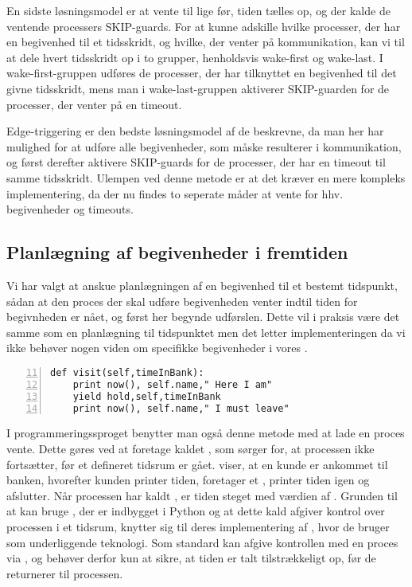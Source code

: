 En sidste løsningsmodel er at vente til lige før, tiden tælles op, og der kalde de ventende processers SKIP-guards. 
For at kunne adskille hvilke processer, der har en begivenhed til et tidsskridt, og hvilke, der venter på kommunikation, kan vi  til at dele hvert tidsskridt op i to grupper, henholdsvis wake-first og wake-last.
I wake-first-gruppen udføres de processer, der har tilknyttet en begivenhed til det givne tidsskridt, mens man i  wake-last-gruppen aktiverer SKIP-guarden for de processer, der venter på en timeout.

Edge-triggering er den bedste løsningsmodel af de beskrevne, da man her har mulighed for at udføre alle begivenheder, som måske resulterer i kommunikation, og først derefter aktivere SKIP-guards for de processer, der har en timeout til samme tidsskridt. Ulempen ved denne metode er at det kræver en mere kompleks implementering, da der nu findes to seperate måder at vente for hhv. begivenheder og timeouts.

\subsection{Planlægning af begivenheder i fremtiden}\label{sec:Wait}
Vi har valgt at anskue planlægningen af en begivenhed til et bestemt tidspunkt, sådan at den proces der skal udføre begivenheden venter indtil tiden for begivnheden er nået, og først her begynde udførslen. Dette vil i praksis være det samme som en planlægning til tidspunktet men det letter implementeringen da vi ikke behøver nogen viden om specifikke begivenheder i vores \sched. 

\begin{lstlisting}[firstnumber=11 , stepnumber=2, numbers=left,float=hbtp, label=fig:simpy:yield, caption= Et yield i \simpy (taget fra Bank05.py i eksemplet fra \simpy)] 
def visit(self,timeInBank):       
    print now(), self.name," Here I am"             
    yield hold,self,timeInBank
    print now(), self.name," I must leave"
\end{lstlisting}
I programmeringssproget \simpy benytter man også denne metode med at lade en proces vente. Dette gøres ved at
foretage kaldet , som sørger for, at processen ikke
fortsætter, før et defineret tidsrum er gået.  viser, at en kunde er ankommet til banken, hvorefter kunden printer tiden, foretager et , printer tiden igen og afslutter.  Når processen har kaldt , er tiden steget med værdien af . Grunden til at \simpy kan bruge , der er indbygget i Python og at dette kald afgiver kontrol over processen i et tidsrum, knytter sig til deres implementering af \simpy, hvor de bruger  som underliggende teknologi. Som standard kan   afgive kontrollen med en proces via , og \simpy behøver derfor kun at sikre, at tiden er talt tilstrækkeligt op, før de returnerer til processen.

